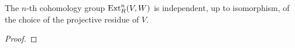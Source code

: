 \begin{thm}
    The $n$-th cohomology group $\operatorname{Ext}^n_R(V,W)$ is independent, up to isomorphism, of the choice of the projective residue of $V$.
\end{thm}
\begin{proof}
\end{proof}



